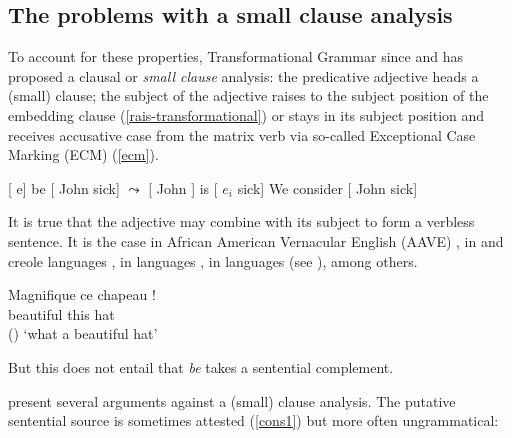 \documentclass[output=paper
	        ,collection
	        ,collectionchapter
 	        ,biblatex
                ,babelshorthands
                ,newtxmath
                ,draftmode
                ,colorlinks, citecolor=brown
]{langscibook}
\begin{document}
\subsection{The problems with a small clause analysis}

To account for these properties, Transformational Grammar since \citet{Stowell1983} and
\citet{Chomsky1986} has proposed a clausal or \emph{small clause} analysis: the predicative
adjective heads a (small) clause; the subject of the adjective raises to the subject position of the
embedding clause (\ref{rais-transformational}) or stays in its subject position and receives accusative case from
the matrix verb via so-called Exceptional Case Marking (ECM) (\ref{ecm}).


\eal
\ex
\label{rais-transformational}
{}[ e] be [ John sick] $\leadsto$  [ John ] is  [ $e_{i}$ sick]
\ex
\label{ecm}
We consider [ John sick]
\zl

It is true that the adjective may combine with its subject to form a verbless sentence. It is the
case in African American Vernacular English (AAVE) \citep{Bender2001a}, in  \citet{Laurens2008} and creole languages
\citet{HenriandAbeille2007}, in  languages \citep{Zec87a-u}, in  languages (see
\citealp{Alqurashi:Borsley:14}), among others. 

\begin{exe}
\ex \gll Magnifique ce chapeau !\\
beautiful this hat\\\hfill{()}
\glt `what a beautiful hat'
\end{exe}

But this does not entail that \emph{be} takes a sentential complement. 




\citet[Chapter~3]{PollardandSag1994} present several arguments against a (small) clause analysis. The putative sentential source is sometimes attested (\ref{cons1}) but more often ungrammatical:
\end{document}
